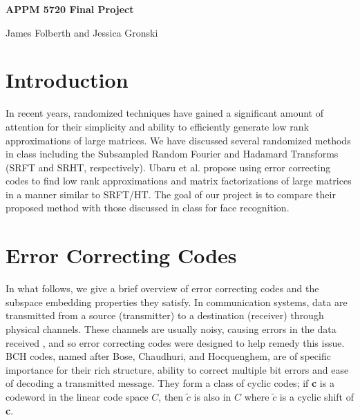 \documentclass[12pt]{article}
\newcommand{\tbf}{\textbf}
\begin{document}
\flushleft

\centerline{\large \bf APPM 5720 Final Project}
\vspace{\baselineskip}
{\large \centerline{James Folberth and Jessica Gronski}}
\vspace{\baselineskip}

\section{Introduction}
In recent years, randomized techniques have gained a significant amount of attention for their simplicity and ability to efficiently generate low rank approximations of large matrices. We have discussed several randomized methods in class including the Subsampled Random Fourier and Hadamard Transforms (SRFT and SRHT, respectively). Ubaru et al. \cite{ubaru2015low} propose using error correcting codes to find low rank approximations and matrix factorizations of large matrices in a manner similar to SRFT/HT. The goal of our project is to compare their proposed method with those discussed in class for face recognition. 

\section{Error Correcting Codes}
In what follows, we give a brief overview of error correcting codes and the subspace embedding properties they satisfy. In communication systems, data are transmitted from a source (transmitter) to a destination (receiver) through physical channels. These channels are usually noisy, causing errors in the data received \cite{ubaru2015low}, and so error correcting codes were designed to help remedy this issue. BCH codes, named after  Bose, Chaudhuri, and Hocquenghem, are of specific importance for their rich structure, ability to correct multiple bit errors and ease of decoding a transmitted message. They form a class of cyclic codes; if \tbf{c} is a codeword in the linear code space $C$, then \tbf{$\tilde{c}$} is also in $C$ where \tbf{$\tilde{c}$} is a cyclic shift of \tbf{c}. 

\vspace{3mm}
\end{document}
